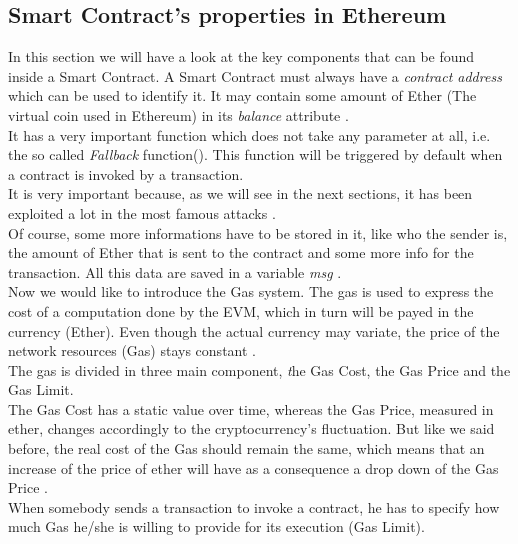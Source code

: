 \subsection{Smart Contract's properties in Ethereum}
In this section we will have a look at the key components that can be found inside a Smart Contract.
A Smart Contract must always have a {\itshape contract address} 
which can be used to identify it. It may contain some amount of Ether (The virtual coin used in Ethereum) in its {\itshape balance} attribute \cite{paper1}.
\\It has a very important function which does not take any parameter at all, i.e. the so called {\itshape Fallback} function(). This function will be triggered by default when a contract is invoked by a transaction.
\\It is very important because, as we will see in the next sections, it has been exploited a lot in the most famous attacks \cite{paper2}. 
\\Of course, some more informations have to be stored in it, like who the sender is, the amount of Ether that is sent to the contract and some more info for the transaction. All this data are saved in a variable \textit{msg} \cite{daje}. 
\\Now we would like to introduce the Gas system. The gas is used to express the cost of a computation done by the EVM, which in turn will be payed in the currency (Ether). Even though the actual currency may variate, the price of the network resources (Gas) stays constant \cite{paper3}. 
\\The gas is divided in three main component, {\textit the Gas Cost, the Gas Price and the Gas Limit.}
\\The Gas Cost has a static value over time, whereas the Gas Price, measured in ether, changes accordingly to the cryptocurrency's fluctuation. But like we said before, the real cost of the Gas should remain the same, which means that an increase of the price of ether will have as a consequence a drop down of the Gas Price \cite{paper1}. 
\\When somebody sends a transaction to invoke a contract, he has to specify how much Gas he/she is willing to provide for its execution (Gas Limit). 




